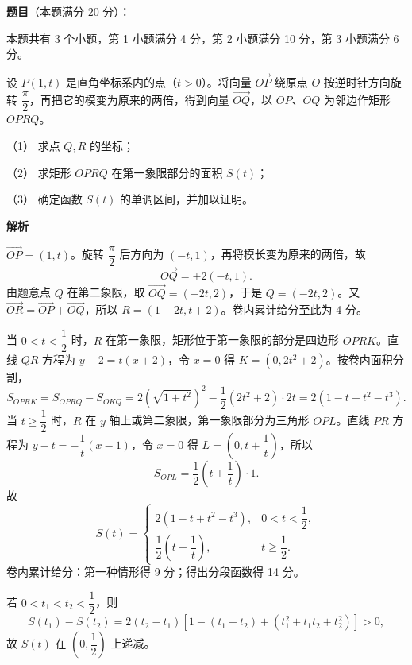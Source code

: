 \begin{answer}

\textbf{题目}（本题满分 20 分）：

本题共有 3 个小题，第 1 小题满分 4 分，第 2 小题满分 10 分，第 3 小题满分 6 分。

设 $P(1,t)$ 是直角坐标系内的点（$t>0$）。将向量 $\overrightarrow{OP}$ 绕原点 $O$ 按逆时针方向旋转 $\dfrac\pi2$，再把它的模变为原来的两倍，得到向量 $\overrightarrow{OQ}$，以 $OP$、$OQ$ 为邻边作矩形 $OPRQ$。

（1） 求点 $Q,R$ 的坐标；

（2） 求矩形 $OPRQ$ 在第一象限部分的面积 $S(t)$；

（3） 确定函数 $S(t)$ 的单调区间，并加以证明。

\textbf{解析}


$\overrightarrow{OP}=(1,t)$。旋转 $\dfrac\pi2$ 后方向为 $(-t,1)$，再将模长变为原来的两倍，故
\nopagebreak[4]
\[
\overrightarrow{OQ}=\pm2(-t,1).
\]
由题意点 $Q$ 在第二象限，取 $\overrightarrow{OQ}=(-2t,2)$，于是 $Q=(-2t,2)$。又 $\overrightarrow{OR}=\overrightarrow{OP}+\overrightarrow{OQ}$，所以 $R=(1-2t,t+2)$。卷内累计给分至此为 4 分。


当 $0<t<\dfrac12$ 时，$R$ 在第一象限，矩形位于第一象限的部分是四边形 $OPRK$。直线 $QR$ 方程为 $y-2=t(x+2)$，令 $x=0$ 得 $K=(0,2t^2+2)$。按卷内面积分割，
\nopagebreak[4]
\[
S_{OPRK}=S_{OPRQ}-S_{OKQ}
=2(\sqrt{1+t^2})^2-\frac12(2t^2+2)\cdot2t
=2(1-t+t^2-t^3).
\]
当 $t\ge\dfrac12$ 时，$R$ 在 $y$ 轴上或第二象限，第一象限部分为三角形 $OPL$。直线 $PR$ 方程为 $y-t=-\dfrac1t(x-1)$，令 $x=0$ 得 $L=(0,t+\dfrac1t)$，所以
\nopagebreak[4]
\[
S_{OPL}=\frac12\left(t+\frac1t\right)\cdot1.
\]
故
\nopagebreak[4]
\[
S(t)=\begin{cases}
2(1-t+t^2-t^3),&0<t<\dfrac12,\\[2pt]
\dfrac12\left(t+\dfrac1t\right),&t\ge\dfrac12.
\end{cases}
\]
卷内累计给分：第一种情形得 9 分；得出分段函数得 14 分。


若 $0<t_1<t_2<\dfrac12$，则
\nopagebreak[4]
\[
S(t_1)-S(t_2)=2(t_2-t_1)\left[1-(t_1+t_2)+(t_1^2+t_1t_2+t_2^2)\right]>0,
\]
故 $S(t)$ 在 $(0,\dfrac12)$ 上递减。


\end{answer}
